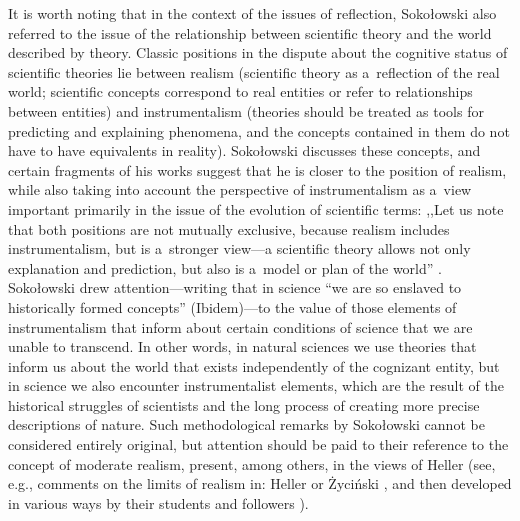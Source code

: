 \documentclass[%
  manuscript=article,
  year=2024,
  volume=77,
  doi=00000.000,
]{zfn}
\begin{document}
It is worth noting that in the context of the issues of reflection, Sokołowski also referred to the issue of the relationship between scientific theory and the world described by theory. Classic positions in the dispute about the cognitive status of scientific theories lie between realism (scientific theory as a~reflection of the real world; scientific concepts correspond to real entities or refer to relationships between entities) and instrumentalism (theories should be treated as tools for predicting and explaining phenomena, and the concepts contained in them do not have to have equivalents in reality). Sokołowski discusses these concepts, and certain fragments of his works suggest that he is closer to the position of realism, while also taking into account the perspective of instrumentalism as a~view important primarily in the issue of the evolution of scientific terms: ,,Let us note that both positions are not mutually exclusive, because realism includes instrumentalism, but is a~stronger view---a scientific theory allows not only explanation and prediction, but also is a~model or plan of the world''
\parencite[][]{Sokoowski1986Pluralizm}. %
 Sokołowski drew attention---writing that in science ``we are so enslaved to historically formed concepts''
 (Ibidem)---to the value of those elements of instrumentalism that inform about certain conditions of science that we are unable to transcend. In other words, in natural sciences we use theories that inform us about the world that exists independently of the cognizant entity, but in science we also encounter instrumentalist elements, which are the result of the historical struggles of scientists and the long process of creating more precise descriptions of nature. Such methodological remarks by Sokołowski cannot be considered entirely original, but attention should be paid to their reference to the concept of moderate realism, present, among others, in the views of Heller (see, e.g., comments on the limits of realism in: Heller 
\parencite*[][pp.80–81]{Heller1992AFilozofia} %
 or Życiński 
\parencite*[e.g.,][]{Zycinski1993Granice}, %
 and then developed in various ways by their students and followers 
\parencites[e.g.,][]{Sierotowicz1997Realizm}[][]{Rodzen2005Czy}%
).
\end{document}
